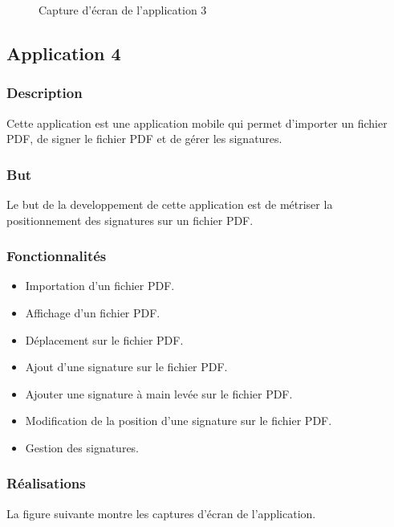 \begin{figure}[H]
    \centering
    \caption{Capture d'écran de l'application 3}
    \label{appendix:capture_app3}
\end{figure}

\subsection{Application 4 }

\subsubsection{Description}
Cette application est une application mobile qui permet d'importer un fichier PDF, de signer le fichier PDF et de gérer les signatures.

\subsubsection{But}
Le but de la developpement de cette application est de métriser la positionnement des signatures sur un fichier PDF.

\subsubsection{Fonctionnalités}
\begin{itemize}
    \item Importation d'un fichier PDF.
    \item Affichage d'un fichier PDF.
    \item Déplacement sur le fichier PDF.
    \item Ajout d'une signature sur le fichier PDF.
    \item Ajouter une signature à main levée sur le fichier PDF.
    \item Modification de la position d'une signature sur le fichier PDF.
    \item Gestion des signatures.
\end{itemize}

\subsubsection{Réalisations}

La figure suivante montre les captures d'écran de l'application.


